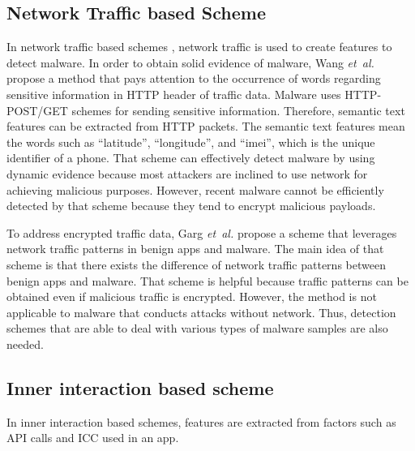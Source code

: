 \documentclass{ieeeaccess}
\newcommand{\etal}{\textit{et~al.}}
\begin{document}
\subsection{Network Traffic based Scheme}
In network traffic based schemes \cite{wang2018detecting,garg2017network}, network traffic is used to create features to detect malware.
In order to obtain solid evidence of malware, Wang \etal \cite{wang2018detecting} propose a method that pays attention to the occurrence of words regarding sensitive information in HTTP header of traffic data.
Malware uses HTTP-POST/GET schemes for sending sensitive information.
Therefore, semantic text features can be extracted from HTTP packets. 
The semantic text features mean the words such as ``latitude'', ``longitude'', and ``imei'', which is the unique identifier of a phone.
That scheme can effectively detect malware by using dynamic evidence because most attackers are inclined to use network for achieving malicious purposes.
However, recent malware cannot be efficiently detected by that scheme because they tend to encrypt malicious payloads.

To address encrypted traffic data, Garg \etal \cite{garg2017network} propose a scheme that leverages network traffic patterns in benign apps and malware.
The main idea of that scheme is that there exists the difference of network traffic patterns between benign apps and malware. 
That scheme is helpful because traffic patterns can be obtained even if malicious traffic is encrypted.
However, the method is not applicable to malware that conducts attacks without network.
Thus, detection schemes that are able to deal with various types of malware samples are also needed.

\subsection{Inner interaction based scheme}
In inner interaction based schemes, features are extracted from factors such as API calls and ICC used in an app.
\end{document}
